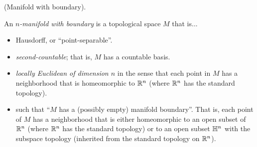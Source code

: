 \begin{defn}
     (Manifold with boundary). 
    
    An \textit{$n$-manifold with boundary} is a topological space $M$ that is...
    
    \begin{itemize}
        \item Hausdorff, or ``point-separable''.
        \item \textit{second-countable}; that is, $M$ has a countable basis.
        \item \textit{locally Euclidean of dimension $n$} in the sense that each point in $M$ has a neighborhood that is homeomorphic to $\mathbb{R}^n$ (where $\mathbb{R}^n$ has the standard topology).
        \item such that ``$M$ has a (possibly empty) manifold boundary''. That is, each point of $M$ has a neighborhood that is either homeomorphic to an open subset of $\mathbb{R}^n$ (where $\mathbb{R}^n$ has the standard topology) or to an open subset $\mathbb{H}^n$ with the subspace topology (inherited from the standard topology on $\mathbb{R}^n$).
    \end{itemize}
\end{defn}

